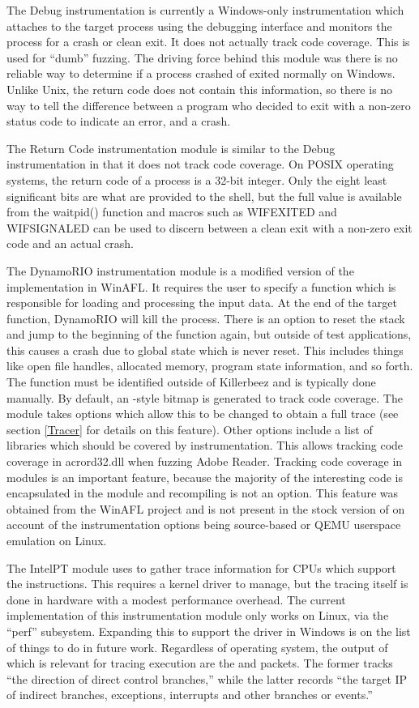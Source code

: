 The Debug instrumentation is currently a Windows-only instrumentation which
attaches to the target process using the debugging interface and monitors the
process for a crash or clean exit.  It does not actually track code coverage.
This is used for ``dumb'' fuzzing.  The driving force behind this module was
there is no reliable way to determine if a process crashed of exited normally
on Windows.  Unlike Unix, the return code does not contain this information,
so there is no way to tell the difference between a program who decided to
exit with a non-zero status code to indicate an error, and a crash.

The Return Code instrumentation module is similar to the Debug instrumentation
in that it does not track code coverage. On POSIX operating systems, the return
code of a process is a 32-bit integer.  Only the eight least significant bits
are what are provided to the shell, but the full value is available from the
waitpid() function and macros such as WIFEXITED and WIFSIGNALED can be used to
discern between a clean exit with a non-zero exit code and an actual crash.

The DynamoRIO instrumentation module is a modified version of the
implementation in WinAFL. It requires the user to specify a function which
is responsible for loading and processing the input data. At the end of the
target function, DynamoRIO will kill the process. There is an option to reset
the stack and jump to the beginning of the function again, but outside of test
applications, this causes a crash due to global state which is never reset.
This includes things like open file handles, allocated memory, program state
information, and so forth. The function must be identified outside of
Killerbeez and is typically done manually. By default, an \AFL{}-style bitmap
is generated to track code coverage. The module takes options which allow this
to be changed to obtain a full trace (see section \ref{Tracer} for details on
this feature). Other options include a list of libraries which should be
covered by instrumentation. This allows tracking code coverage in acrord32.dll
when fuzzing Adobe Reader.  Tracking code coverage in modules is an important
feature, because the majority of the interesting code is encapsulated in the
module and recompiling is not an option. This feature was obtained from the
WinAFL\cite{winafl} project and is not present in the stock version of \AFL{}
on account of the instrumentation options being source-based or QEMU userspace
emulation on Linux.

The IntelPT module uses \IPT{} to gather trace information for CPUs which
support the \IPT{} instructions. This requires a kernel driver to manage, but
the tracing itself is done in hardware with a modest performance overhead. The
current implementation of this instrumentation module only works on Linux, via
the ``perf'' subsystem. Expanding this to support the \IPT{} driver in Windows
is on the list of things to do in future work. Regardless of operating system,
the output of \IPT{} which is relevant for tracing execution are the \TNT{} and
\TIP{} packets.  The former tracks ``the direction of direct control branches,''
while the latter records ``the target IP of indirect branches, exceptions,
interrupts and other branches or events.''\cite{intelptmanual}

